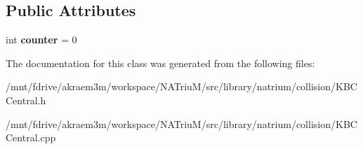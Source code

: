 \subsection*{Public Attributes}
\begin{DoxyCompactItemize}
\item 
\hypertarget{classnatrium_1_1KBCCentral_a1c191a3567b05a6153e556b9cb4e013a}{
int {\bfseries counter} = 0}
\label{classnatrium_1_1KBCCentral_a1c191a3567b05a6153e556b9cb4e013a}

\end{DoxyCompactItemize}


The documentation for this class was generated from the following files:\begin{DoxyCompactItemize}
\item 
/mnt/fdrive/akraem3m/workspace/NATriuM/src/library/natrium/collision/KBCCentral.h\item 
/mnt/fdrive/akraem3m/workspace/NATriuM/src/library/natrium/collision/KBCCentral.cpp\end{DoxyCompactItemize}
